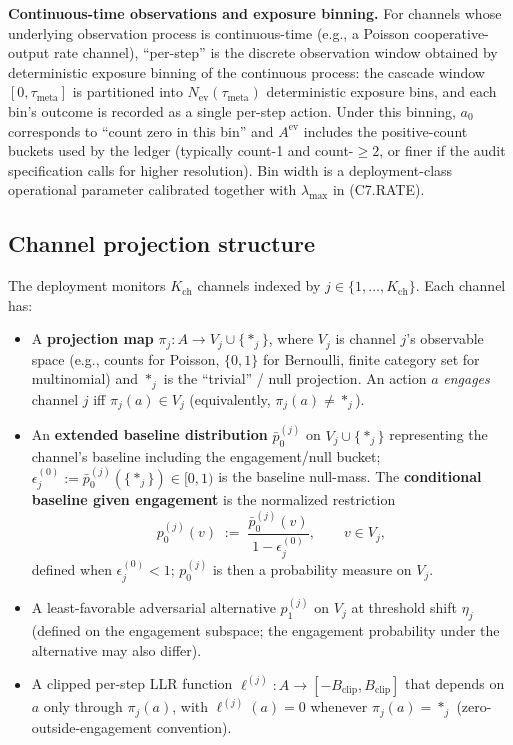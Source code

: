 \documentclass{article}
\newcommand{\Bclip}{B_{\mathrm{clip}}}
\newcommand{\Kch}{K_{\mathrm{ch}}}
\newcommand{\Nev}{N_{\mathrm{ev}}}
\newcommand{\lammax}{\lambda_{\max}}
\newcommand{\taumeta}{\tau_{\mathrm{meta}}}
\begin{document}
\textbf{Continuous-time observations and exposure binning.}  For
channels whose underlying observation process is continuous-time
(e.g., a Poisson cooperative-output rate channel),
``per-step'' is the discrete observation window obtained by
deterministic exposure binning of the continuous process: the
cascade window $[0, \taumeta]$ is partitioned into $\Nev(\taumeta)$
deterministic exposure bins, and each bin's outcome is recorded
as a single per-step action.  Under this binning, $a_0$
corresponds to ``count zero in this bin'' and $A^{\mathrm{ev}}$
includes the positive-count buckets used by the ledger
(typically count-1 and count-$\geq 2$, or finer if the audit
specification calls for higher resolution).  Bin width is a
deployment-class operational parameter calibrated together with
$\lammax$ in (C7.RATE).

\subsection{Channel projection structure}

The deployment monitors $\Kch$ channels indexed by $j \in
\{1, \ldots, \Kch\}$.  Each channel has:
\begin{itemize}
\item A \textbf{projection map} $\pi_j: A \to V_j \cup \{*_j\}$,
  where $V_j$ is channel $j$'s observable space (e.g., counts for
  Poisson, $\{0,1\}$ for Bernoulli, finite category set for
  multinomial) and $*_j$ is the ``trivial'' / null projection.  An
  action $a$ \emph{engages} channel $j$ iff $\pi_j(a) \in V_j$
  (equivalently, $\pi_j(a) \neq *_j$).
\item An \textbf{extended baseline distribution} $\bar{p}_0^{(j)}$
  on $V_j \cup \{*_j\}$ representing the channel's baseline
  including the engagement/null bucket; $\epsilon_j^{(0)} :=
  \bar{p}_0^{(j)}(\{*_j\}) \in [0, 1)$ is the baseline null-mass.
  The \textbf{conditional baseline given engagement} is the
  normalized restriction
  \[
    p_0^{(j)}(v) \;:=\; \frac{\bar{p}_0^{(j)}(v)}{1 -
    \epsilon_j^{(0)}}, \qquad v \in V_j,
  \]
  defined when $\epsilon_j^{(0)} < 1$; $p_0^{(j)}$ is then a
  probability measure on $V_j$.
\item A least-favorable adversarial alternative $p_1^{(j)}$ on
  $V_j$ at threshold shift $\eta_j$ (defined on the engagement
  subspace; the engagement probability under the alternative may
  also differ).
\item A clipped per-step LLR function
  $\ell^{(j)}: A \to [-\Bclip, \Bclip]$ that depends on $a$ only
  through $\pi_j(a)$, with $\ell^{(j)}(a) = 0$ whenever $\pi_j(a)
  = *_j$ (zero-outside-engagement convention).
\end{itemize}
\end{document}
